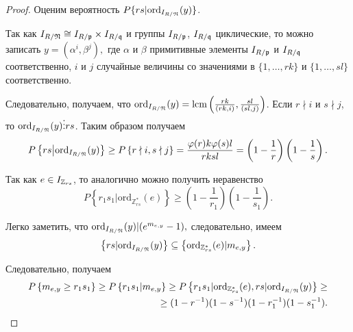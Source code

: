 \documentclass[_00_dissertation.tex]{subfiles}
\begin{document}
\begin{proof}
    Оценим вероятность $P\{rs | \textrm{ord}_{I_{R / \mathfrak{N}}}(y)\}$.

    Так как $I_{R / \mathfrak{N}} \cong I_{R / \mathfrak{p}} \times I_{R / \mathfrak{q}}$ и группы $I_{R / \mathfrak{p}}$, $I_{R / \mathfrak{q}}$ циклические, то можно записать $y = (\alpha^i, \beta^j),$ где $\alpha$ и $\beta$ примитивные элементы $I_{R / \mathfrak{p}}$ и $I_{R / \mathfrak{q}}$ соответственно, $i$ и $j$ случайные величины со значениями в $\{1, \ldots, rk\}$ и $\{1, \ldots, s l\}$ соответственно.
    
    Следовательно, получаем, что $\textrm{ord}_{I_{R / \mathfrak{N}}}(y) = \textrm{lcm}\left(\frac{rk}{(rk,i)}, \frac{sl}{(sl,j)}\right)$.
    Если $r \nmid i$ и $s \nmid j$, то $\textrm{ord}_{I_{R / \mathfrak{N}}}(y) \vdots rs$.
    Таким образом получаем
    \begin{equation*}
        P\left\{
            rs \big| \textrm{ord}_{I_{R / \mathfrak{N}}}(y)
        \right\} \ge P\left\{
            r\nmid i, s \nmid j
        \right\} = \frac{\varphi(r)k\varphi(s)l}{rksl} = \left(
            1-\frac{1}{r}
        \right)\left(
            1-\frac{1}{s}
        \right).
    \end{equation*}

    Так как $e \in I_{\mathbb{Z}_{rs}}$, то аналогично можно получить неравенство
    \begin{equation*}
        P\left\{
            r_1s_1|\textrm{ord}_{\mathbb{Z}^*_{rs}}(e)
        \right\} \ge \left(
            1-\frac{1}{r_1}
        \right)\left(
            1-\frac{1}{s_1}
        \right).
    \end{equation*}

    Легко заметить, что $\textrm{ord}_{I_{R / \mathfrak{N}}}(y) | (e^{m_{e,y}}-1),$ следовательно, имеем
    \begin{equation*}
        \left\{
            rs | \textrm{ord}_{I_{R / \mathfrak{N}}}(y)
        \right\} \subseteq \left\{
            \textrm{ord}_{\mathbb{Z}^*_{rs}}(e) | m_{e,y}
        \right\}.
    \end{equation*}

    Следовательно, получаем
    \begin{equation*}
        \begin{split}
            P\left\{
                m_{e,y} \ge r_1s_1
            \right\} \ge P\left\{
                r_1s_1 | m_{e,y}
            \right\} \ge P\left\{
                r_1s_1|\textrm{ord}_{\mathbb{Z}^*_{rs}}(e), rs|\textrm{ord}_{I_{R / \mathfrak{N}}}(y)
            \right\} \ge \\
            \ge (1-r^{-1})(1-s^{-1})(1-r_1^{-1})(1-s_1^{-1}).
        \end{split}
    \end{equation*}
\end{proof}
\end{document}
